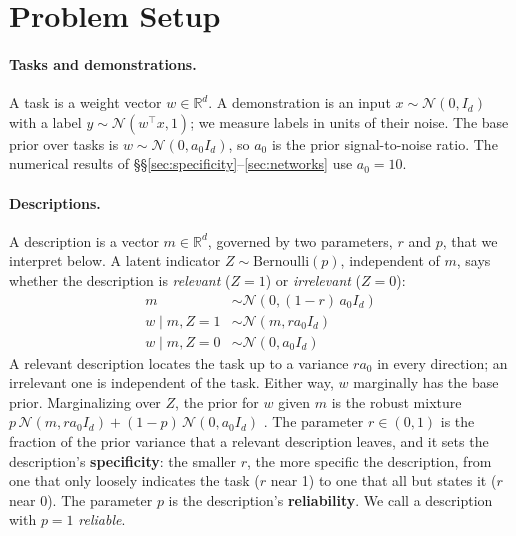 \documentclass{article}
\newcommand{\R}{\mathbb{R}}
\begin{document}
\section{Problem Setup}\label{sec:setting}

\paragraph{Tasks and demonstrations.} A task is a weight vector $w \in \R^d$. A demonstration is an input $x \sim \mathcal{N}(0, I_d)$ with a label $y \sim \mathcal{N}(w^\top x, 1)$; we measure labels in units of their noise. The base prior over tasks is $w \sim \mathcal{N}(0, a_0 I_d)$, so $a_0$ is the prior signal-to-noise ratio. The numerical results of \S\S\ref{sec:specificity}--\ref{sec:networks} use $a_0 = 10$.

\paragraph{Descriptions.} A description is a vector $m \in \R^d$, governed by two parameters, $r$ and $p$, that we interpret below. A latent indicator $Z \sim \mathrm{Bernoulli}(p)$, independent of $m$, says whether the description is \emph{relevant} ($Z = 1$) or \emph{irrelevant} ($Z = 0$):
\begin{align*}
    m &\sim \mathcal{N}(0, (1-r)\,a_0 I_d) \\
    w \mid m, Z=1 &\sim \mathcal{N}(m, r a_0 I_d) \\
    w \mid m, Z=0 &\sim \mathcal{N}(0, a_0 I_d)
\end{align*}
A relevant description locates the task up to a variance $r a_0$ in every direction; an irrelevant one is independent of the task. Either way, $w$ marginally has the base prior. Marginalizing over $Z$, the prior for $w$ given $m$ is the robust mixture $p\,\mathcal{N}(m, r a_0 I_d) + (1-p)\,\mathcal{N}(0, a_0 I_d)$ \citep{schmidli2014}. The parameter $r \in (0, 1)$ is the fraction of the prior variance that a relevant description leaves, and it sets the description's \textbf{specificity}: the smaller $r$, the more specific the description, from one that only loosely indicates the task ($r$ near 1) to one that all but states it ($r$ near 0). The parameter $p$ is the description's \textbf{reliability}. We call a description with $p = 1$ \emph{reliable}.
\end{document}
